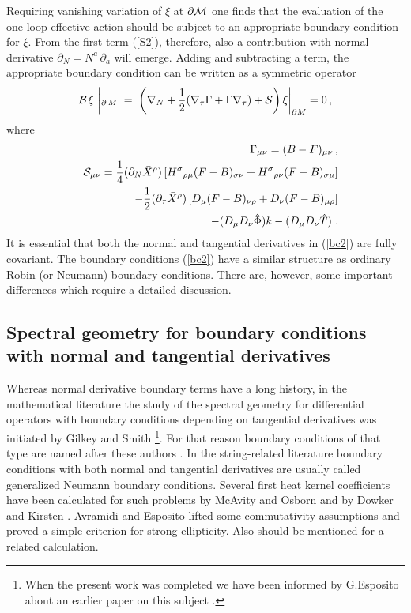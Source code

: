 \documentclass[a4paper,12pt]{article}
\begin{document}
Requiring vanishing variation of $\xi$ at $\partial 
{\cal M}$ one finds that the evaluation of the one-loop effective 
action should be subject to an appropriate boundary 
condition for $\xi$. From the first term (\ref{S2}), therefore, also 
a contribution with normal derivative $\partial_N = N^a\, 
\partial_a$ will emerge. Adding and subtracting a term, the 
appropriate boundary condition can be written as a symmetric 
operator 
\begin{equation}
{\cal B}\, \xi\, \left|_{\partial\, M}\; = \; 
\left( \nabla_{N}+\frac{1}{2}(\nabla_{\tau }\Gamma 
+\Gamma \nabla_{\tau }) + {\cal S}\right) \xi \right|_{\partial  M}=0
\,, \label{bc2}
\end{equation}
where
\begin{eqnarray}
&&\Gamma_{\mu\nu}=(B-F)_{\mu\nu} \,,\nonumber \\
&&{\cal S}_{\mu\nu}=\frac 14 (\partial_N \bar X^\rho ) \left[
{H^\sigma}_{\rho\mu}(F-B)_{\sigma\nu} +
{H^\sigma}_{\rho\nu}(F-B)_{\sigma\mu} \right] 
\nonumber \\
&&\qquad -\frac 12 (\partial_\tau \bar X^\rho )
\left[ D_{\mu} (F-B)_{\nu\rho} +D_\nu (F-B)_{\mu\rho} \right]
\nonumber \\
&&\qquad -(D_\mu D_\nu \hat \Phi )k -(D_\mu D_\nu \hat T )\; .
\label{bc3}
\end{eqnarray}
It is essential that both the normal and tangential
derivatives in (\ref{bc2}) are fully covariant.
The boundary conditions (\ref{bc2}) have a  similar 
structure as ordinary
Robin (or Neumann) boundary conditions. There 
are, however, some important differences which require a 
detailed discussion. 


\subsection{Spectral geometry for boundary conditions with normal and
tangential derivatives}\label{ellipt}

Whereas normal derivative boundary terms have a long 
history, in the mathematical literature the 
study of the spectral geometry for differential operators with
boundary conditions depending on tangential
derivatives was initiated by Gilkey and Smith \cite{GilkeySmith}
\footnote{When the present work was completed 
we have been informed by G.Esposito about an earlier paper
on this subject \cite{Grubb}.}.
For that reason boundary conditions of that type are 
named after these authors \cite{AvEs3}. In the string-related literature
boundary conditions with both normal and tangential derivatives
are usually called generalized Neumann boundary conditions.
Several
first heat kernel coefficients have been calculated for such 
problems  by 
McAvity and Osborn \cite{McO} and by Dowker and Kirsten \cite{DK}.
Avramidi and Esposito \cite{AEearlier,AE,AvEs,AvEs3} lifted some commutativity
assumptions and proved a simple criterion for strong
ellipticity. Also \cite{EV} should be mentioned for a related calculation.
\end{document}
